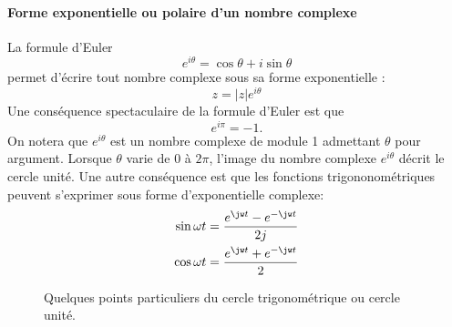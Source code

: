 \paragraph{Forme exponentielle ou polaire d'un nombre complexe}
La formule d'Euler 
\[
e^{i\theta}=\cos\theta+i\sin\theta
\]
permet d'écrire tout nombre complexe sous sa forme exponentielle : 
\[
z=|z|e^{i\theta}
\]
Une conséquence spectaculaire de la formule d'Euler est que
\[
e^{i\pi}=-1.
\]
On notera que $e^{i\theta}$ est un nombre complexe de module 1 admettant 
$\theta$ pour argument. Lorsque $\theta$ varie de $0$ à $2\pi$, l'image du 
nombre complexe $e^{i\theta}$ décrit le cercle unité.
Une autre conséquence est que les fonctions trigononométriques peuvent 
s'exprimer sous forme d'exponentielle complexe:
\begin{align*}
    \sin{\omega t}&=\dfrac{e^{\jw t}-e^{-\jw t}}{2j} \\
    \cos{\omega t}&=\dfrac{e^{\jw t}+e^{-\jw t}}{2}
\end{align*}
\begin{figure}[!ht]
    \centering
    
    \caption{Quelques points particuliers du cercle trigonométrique 
    ou cercle unité.}
\end{figure}
